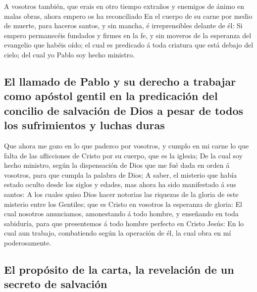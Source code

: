  A vosotros también, que erais en otro tiempo extraños y
enemigos de ánimo en malas obras, ahora empero os ha reconciliado
 En el cuerpo de su carne por medio de muerte, para
haceros santos, y sin mancha, é irreprensibles delante de él:
 Si empero permanecéis fundados y firmes en la fe, y sin
moveros de la esperanza del evangelio que habéis oído; el cual es
predicado á toda criatura que está debajo del cielo; del cual yo Pablo
soy hecho ministro.

\hypertarget{el-llamado-de-pablo-y-su-derecho-a-trabajar-como-apuxf3stol-gentil-en-la-predicaciuxf3n-del-concilio-de-salvaciuxf3n-de-dios-a-pesar-de-todos-los-sufrimientos-y-luchas-duras}{%
\subsection{El llamado de Pablo y su derecho a trabajar como apóstol
gentil en la predicación del concilio de salvación de Dios a pesar de
todos los sufrimientos y luchas
duras}\label{el-llamado-de-pablo-y-su-derecho-a-trabajar-como-apuxf3stol-gentil-en-la-predicaciuxf3n-del-concilio-de-salvaciuxf3n-de-dios-a-pesar-de-todos-los-sufrimientos-y-luchas-duras}}

 Que ahora me gozo en lo que padezco por vosotros, y
cumplo en mi carne lo que falta de las aflicciones de Cristo por su
cuerpo, que es la iglesia;  De la cual soy hecho
ministro, según la dispensación de Dios que me fué dada en orden á
vosotros, para que cumpla la palabra de Dios;  A saber,
el misterio que había estado oculto desde los siglos y edades, mas ahora
ha sido manifestado á sus santos:  A los cuales quiso
Dios hacer notorias las riquezas de la gloria de este misterio entre los
Gentiles; que es Cristo en vosotros la esperanza de gloria:
 El cual nosotros anunciamos, amonestando á todo hombre,
y enseñando en toda sabiduría, para que presentemos á todo hombre
perfecto en Cristo Jesús:  En lo cual aun trabajo,
combatiendo según la operación de él, la cual obra en mí poderosamente.

\hypertarget{el-propuxf3sito-de-la-carta-la-revelaciuxf3n-de-un-secreto-de-salvaciuxf3n}{%
\subsection{El propósito de la carta, la revelación de un secreto de
salvación}\label{el-propuxf3sito-de-la-carta-la-revelaciuxf3n-de-un-secreto-de-salvaciuxf3n}}

